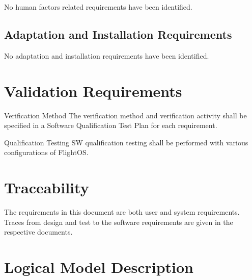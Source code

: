 No human factors related requirements have been identified.

\section{Adaptation and Installation Requirements}

No adaptation and installation requirements have been identified.


\chapter{Validation Requirements}

 {Verification Method}{%
The verification method and verification activity shall be specified 
in a Software Qualification Test Plan for each requirement.
}{}%

 {Qualification Testing}{%
SW qualification testing shall be performed with various configurations of
FlightOS.
}{}%





\chapter{Traceability}

The requirements in this document are both user and system requirements.
Traces from design and test to the software requirements are given in the
respective documents. \cite{flightosADD} \cite{flightosTS}


\chapter{Logical Model Description}

